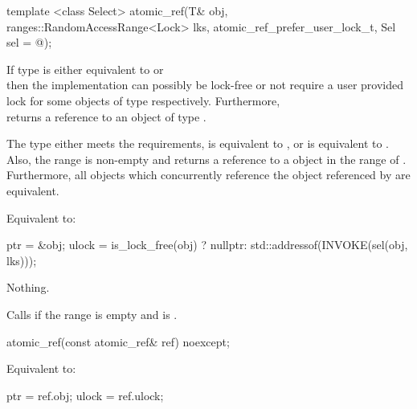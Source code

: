 \begin{addedblock}
\begin{itemdecl}
template <class Select>
atomic_ref(T& obj, ranges::RandomAccessRange<Lock> lks,
  atomic_ref_prefer_user_lock_t, Sel sel = @\unspec@ );
\end{itemdecl}

\begin{itemdescr}
\pnum
\mandates If type  is either equivalent to  
or \\  then the implementation can possibly be
lock-free or not require a user provided lock for some objects of type  
respectively. Furthermore, \\
 returns
a reference to an object of type .

\pnum
\expects The type  either meets the  requirements, 
 is equivalent to , or
 is equivalent to .
Also, the range  is non-empty and  returns a
reference to a  object in the range of . 
Furthermore, all  objects which concurrently reference the object referenced
by  are equivalent.

\pnum
\effects Equivalent to:
\begin{codeblock}
  ptr = &obj;
  ulock = is_lock_free(obj) ? 
    nullptr: std::addressof(INVOKE(sel(obj, lks)));
\end{codeblock}

\pnum
\throws Nothing.

\pnum
\remarks Calls  if the range  is empty and 
 is .

\end{itemdescr}
\end{addedblock}


\begin{itemdecl}
atomic_ref(const atomic_ref& ref) noexcept;
\end{itemdecl}

\begin{itemdescr}
\pnum
\effects {}
\begin{addedblock}Equivalent to:
\begin{codeblock}
  ptr = ref.obj;
  ulock = ref.ulock;
\end{codeblock}
\end{addedblock}

\end{itemdescr}


